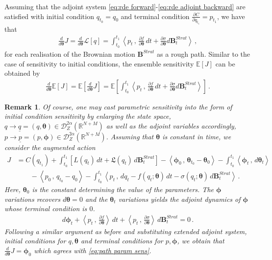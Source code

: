 \documentclass[11pt, oneside]{article}
\numberwithin{equation}{section}
\newtheorem{remark}{Remark}[section]
\theoremstyle{definition}
\newcommand{\mc}[1]{\mathcal{#1}}
\newcommand{\bs}[1]{\boldsymbol{#1}}
\newcommand{\mcal}[1]{\mc{#1}}
\newcommand{\scp}[2]{{\left\langle {#1}\, , \, {#2}\right\rangle}}
\def\p{{\partial}}
\def\p{\partial}
\begin{document}
Assuming that the adjoint system \eqref{eq:rde forward}-\eqref{eq:rde adjoint backward} are satisfied with initial condition $q_{t_0} = q_0$ and terminal condition $\frac{\p C}{\p q_{t_1}} = p_{t_1}$, we have that 
\begin{align}
    \frac{d}{d\bs{\theta}}J = \frac{d}{d\bs{\theta}}\mcal{L}[q] = \int_{t_0}^{t_1}\scp{p_t}{\frac{\p f}{\p \bs{\theta}}\,dt + \frac{\p \sigma}{\p \bs{\theta}}d\mathbf{B}^{Strat}_t}\,,\label{eq:path param sens}
\end{align}
for each realisation of the Brownian motion $\mathbf{B}^{Strat}$ as a rough path. Similar to the case of sensitivity to initial conditions, the ensemble sensitivity $\mathbb{E}[J]$ can be obtained by 
\begin{align}
    \frac{d}{d\bs{\theta}}\mathbb{E}[J] = \mathbb{E}\left[\frac{d}{d\bs{\theta}}J\right] = \mathbb{E}\left[\int_{t_0}^{t_1}\scp{p_t}{\frac{\p f}{\p \bs{\theta}}\,dt + \frac{\p \sigma}{\p \bs{\theta}}d\mathbf{B}^{Strat}_t}\right]\,.\label{eq:param expect sens}
\end{align}
\begin{remark}
Of course, one may cast parametric sensitivity into the form of initial condition sensitivity by enlarging the state space, $q \rightarrow \underline{q} = (q, \bs{\theta}) \in \mcal{D}_Z^{2\alpha}(\mathbb{R}^{N+M})$ as well as the adjoint variables accordingly, $p \rightarrow \underline{p} = (p, \bs{\phi}) \in \mcal{D}_Z^{2\alpha}(\mathbb{R}^{N+M})$. Assuming that $\bs{\theta}$ is constant in time, we consider the augmented action
\begin{align*}
    J &= C(q_{t_1}) +\int_{t_0}^{t_1} \left[L(q_t)\,dt + \mathfrak{L}(q_t)\,d\mathbf{B}^{Strat}_t\right] - \scp{\bs{\phi}_0}{\bs{\theta}_{t_0} - \bs{\theta}_0} - \int_{t_0}^{t_1} \scp{\bs{\phi}_t}{d\bs{\theta}_t} \\ 
    & \qquad  - \scp{p_0}{q_{t_0} - q_0} - \int_{t_0}^{t_1} \scp{p_t}{dq_t - f(q_t;\bs{\theta})\,dt - \sigma(q_t;\bs{\theta})\, d\mathbf{B}^{Strat}_t}  \,.
\end{align*}
Here, $\bs{\theta}_0$ is the constant determining the value of the parameters. The $\bs{\phi}$ variations recovers $d\bs{\theta} = 0$ and the $\bs{\theta}_t$ variations yields the adjoint dynamics of $\bs{\phi}$ whose terminal condition is $0$.
\begin{align*}
    d\bs{\phi}_t+\scp{p_t}{\frac{\p f}{\p \bs{\theta}}}\,dt + \scp{p_t}{\frac{\p \sigma}{\p \bs{\theta}}}\,d\mathbf{B}^{Strat}_t = 0\,.
\end{align*}
Following a similar argument as before and substituting extended adjoint system, initial conditions for $q, \bs{\theta}$ and terminal conditions for $p, \bs{\phi}$, we obtain that $\frac{d}{d\bs{\theta}}J = \bs{\phi}_0$ which agrees with \eqref{eq:path param sens}.
\end{remark}
\end{document}
